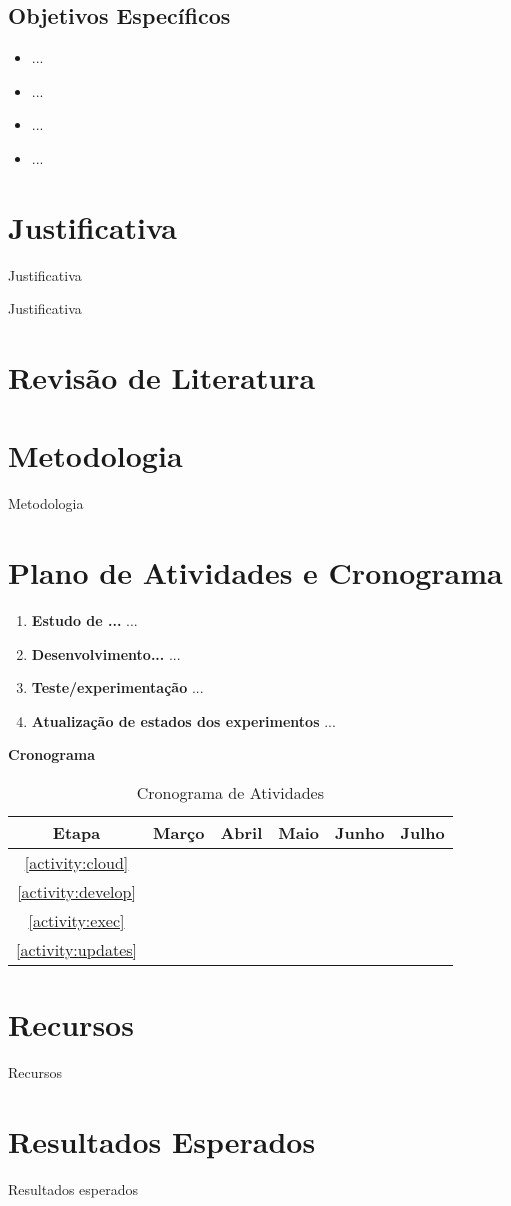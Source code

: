 \documentclass[12pt]{article}
\begin{document}
\subsection{Objetivos Específicos}
\begin{itemize}
	\item ...
	\item ...
	\item ...
	\item ...
    
\end{itemize}

\section{Justificativa}
Justificativa

Justificativa

\section{Revisão de Literatura}
\section{Metodologia}
Metodologia

\section{Plano de Atividades e Cronograma}
\begin{enumerate}
\item \label{activity:cloud} \textbf{Estudo de ...}
...
\item \label{activity:develop} \textbf{Desenvolvimento...}
...
\item \label{activity:exec} \textbf{Teste/experimentação}
...
\item  \label{activity:updates} \textbf{Atualização de estados dos experimentos}
...
\end{enumerate}
\textbf{Cronograma}

\begin{table}[ht]
\centering
\begin{tabular}{c|ccccc}
	Etapa & Março & Abril & Maio & Junho & Julho \\ \hline
	\ref{activity:cloud} & \checkmark & & & \\
	\ref{activity:develop} & \checkmark & \checkmark & & \\
	\ref{activity:exec} & & \checkmark & \checkmark & \checkmark & \\
	\ref{activity:updates} & & &\checkmark & \checkmark & \checkmark \\
\end{tabular}
\caption{Cronograma de Atividades}

\end{table}
\section{Recursos}
Recursos
\section{Resultados Esperados}
Resultados esperados


\end{document}
